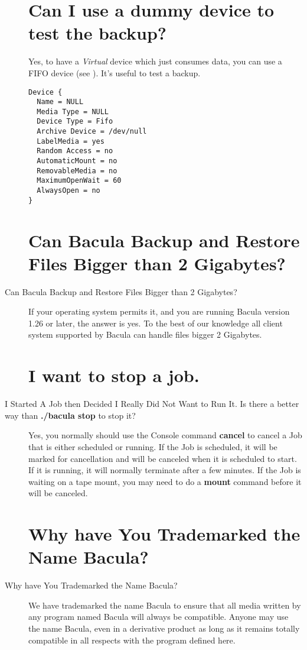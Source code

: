 \begin{description}
\label{testbackup}
\section{Can I use a dummy device to test the backup?}
   Yes, to have a {\sl Virtual} device which just consumes data, you can use a
   FIFO device (see ).
   It's useful to test a backup.
\footnotesize
\begin{verbatim}
Device {
  Name = NULL
  Media Type = NULL
  Device Type = Fifo
  Archive Device = /dev/null
  LabelMedia = yes
  Random Access = no
  AutomaticMount = no
  RemovableMedia = no
  MaximumOpenWait = 60
  AlwaysOpen = no
}
\end{verbatim}
\normalsize

\label{bigfiles}
\section{Can Bacula Backup and Restore Files Bigger than 2 Gigabytes?}
\item [Can Bacula Backup and Restore Files Bigger than 2 Gigabytes?]
If your operating system permits it, and you are running Bacula version
1.26 or later, the answer is yes.  To the best of our knowledge all client
system supported by Bacula can handle files bigger 2 Gigabytes.

\label{cancel}
\section{I want to stop a job.}
\item [I Started A Job then Decided I Really Did Not Want to Run It. Is
   there  a better way than {\bf ./bacula stop} to stop it?]
   Yes, you normally should use the Console command {\bf cancel} to cancel
   a Job that is either scheduled or running.  If the Job is scheduled, it
   will be marked for cancellation and will be canceled when it is
   scheduled to start.  If it is running, it will normally terminate after
   a few minutes.  If the Job is waiting on a tape mount, you may need to
   do a {\bf mount} command before it will be canceled.

\label{trademark}
\section{Why have You Trademarked the Name Bacula?}
\item [Why have You Trademarked the Name
   Bacula\raisebox{.6ex}{{\footnotesize \textsuperscript{\textregistered}}}?]
We have trademarked the name Bacula to ensure that all media  written by any
program named Bacula will always be compatible. Anyone  may use the name
Bacula, even in a derivative product as long as it  remains totally compatible
in all respects with the program defined  here.


\end{description}
